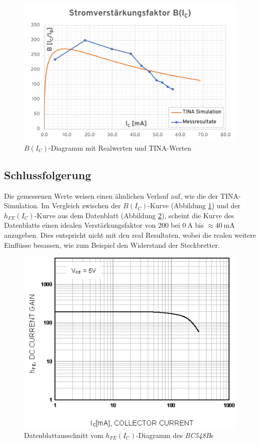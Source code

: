 \documentclass[../main.tex]{subfiles}
\begin{document}
\begin{figure}[H]
    \centering
    \includegraphics[scale=0.8]{assets/task1_DC_amplification/task1_B_IC.png}
    \caption{$B(I_C)$-Diagramm mit Realwerten und TINA-Werten}
    \label{fig:diagram_results_IC_B}
\end{figure}
\newpage
\subsection{Schlussfolgerung}

Die gemessenen Werte weisen einen ähnlichen Verlauf auf, wie die der TINA-Simulation. Im Vergleich zwischen der $B(I_C)$-Kurve (Abbildung \ref{fig:diagram_results_IC_B}) und der $h_{FE}(I_C)$-Kurve aus dem Datenblatt (Abbildung \ref{fig:datasheet_BC548B_IC_BFE}), scheint die Kurve des Datenblatts einen idealen Verstärkungsfaktor von $200$ bei $\SI{0}{\ampere}$ bis $\approx \SI{40}{\milli\ampere}$ anzugeben. Dies entspricht nicht mit den real Resultaten, wobei die realen weitere Einflüsse besassen, wie zum Beispiel den Widerstand der Steckbretter.

\begin{figure}[H]
    \centering
    \includegraphics[scale=0.7]{assets/task1_DC_amplification/datasheet_BC548B_IC_HFE.png}
    \caption{Datenblattausschnitt vom $h_{FE}(I_C)$-Diagramm des \textit{BC548B}s}
    \label{fig:datasheet_BC548B_IC_BFE}
\end{figure}
\end{document}
